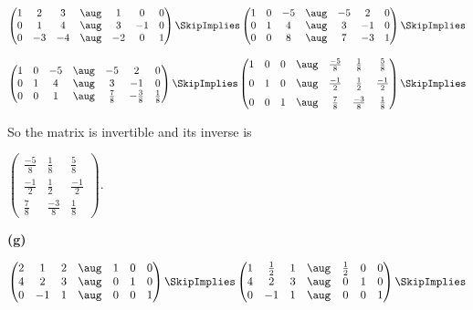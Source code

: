 \documentclass[oneside,12pt]{amsart}
\begin{document}
\bigskip

$
\begin{pmatrix}
1 & 2  & 3  &  \aug & 1 & 0 & 0 \\
0 & 1  & 4  &  \aug & 3 & -1 & 0 \\
0 & -3 & -4 &  \aug & -2 & 0 & 1
\end{pmatrix}
\SkipImplies
\begin{pmatrix}
1 & 0 & -5 & \aug  & -5   & 2 & 0 \\
0 & 1 & 4 &  \aug  &  3   & -1 & 0 \\
0 & 0 & 8 &  \aug  &  7   & -3 & 1
\end{pmatrix}
\SkipImplies
$

\bigskip

$
\begin{pmatrix}
1 & 0 & -5 & \aug  & -5   & 2 & 0 \\
0 & 1 & 4 &  \aug  &  3   & -1 & 0 \\
0 & 0 & 1 &  \aug  &  \frac{7}{8}   & -\frac{3}{8} & \frac{1}{8}
\end{pmatrix}
\SkipImplies
\begin{pmatrix}
1 & 0 & 0 & \aug & \frac{-5}{8} & \frac{1}{8} & \frac{5}{8} \\[6pt]
0 & 1 & 0 & \aug & \frac{-1}{2} & \frac{1}{2} & \frac{-1}{2} \\[6pt]
0 & 0 & 1 & \aug & \frac{7}{8} & \frac{-3}{8} & \frac{1}{8}
\end{pmatrix}
\SkipImplies
$

So the matrix is invertible and its inverse is

\bigskip

$
\begin{pmatrix}
\frac{-5}{8} & \frac{1}{8} & \frac{5}{8} \\[6pt]
\frac{-1}{2} & \frac{1}{2} & \frac{-1}{2} \\[6pt]
\frac{7}{8} & \frac{-3}{8} & \frac{1}{8}
\end{pmatrix}
$.


\bigskip

\textbf{(g)}

\bigskip

$
\begin{pmatrix}
2 &  1  & 2  & \aug & 1 & 0 & 0 \\
4 &  2  & 3  & \aug & 0 & 1 & 0 \\
0 & -1 & 1 & \aug & 0 & 0 & 1
\end{pmatrix}
\SkipImplies
\begin{pmatrix}
1 & \frac{1}{2} & 1  &  \aug & \frac{1}{2} & 0 & 0 \\
4 &  2  & 3  & \aug & 0 & 1 & 0 \\
0 & -1 & 1 & \aug & 0 & 0 & 1
\end{pmatrix}
\SkipImplies
$
\end{document}
